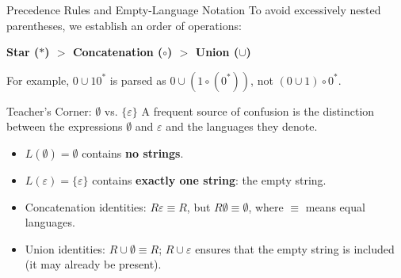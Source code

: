 \documentclass[10pt]{beamer}
\begin{document}
\begin{frame}{Precedence Rules and Empty-Language Notation}
  To avoid excessively nested parentheses, we establish an order of operations:
  \begin{center}
    \textbf{Star ($*$) \quad $>$ \quad Concatenation ($\circ$) \quad $>$ \quad Union ($\cup$)}
  \end{center}
  For example, $0 \cup 10^*$ is parsed as $0 \cup (1 \circ (0^*))$, not $(0 \cup 1) \circ 0^*$.
  \pause
  \vspace{0.25cm}

  \begin{alertblock}{Teacher's Corner: $\emptyset$ vs. $\{\varepsilon\}$}
    A frequent source of confusion is the distinction between the expressions
    $\emptyset$ and $\varepsilon$ and the languages they denote.
    \begin{itemize}
      \item $L(\emptyset)=\emptyset$ contains \textbf{no strings}.
      \item $L(\varepsilon)=\{\varepsilon\}$ contains \textbf{exactly one
        string}: the empty string.
      \item Concatenation identities: $R\varepsilon\equiv R$, but
        $R\emptyset\equiv\emptyset$, where $\equiv$ means equal languages.
      \item Union identities: $R\cup\emptyset\equiv R$; $R\cup\varepsilon$
        ensures that the empty string is included (it may already be present).
    \end{itemize}
  \end{alertblock}
\end{frame}
\end{document}
